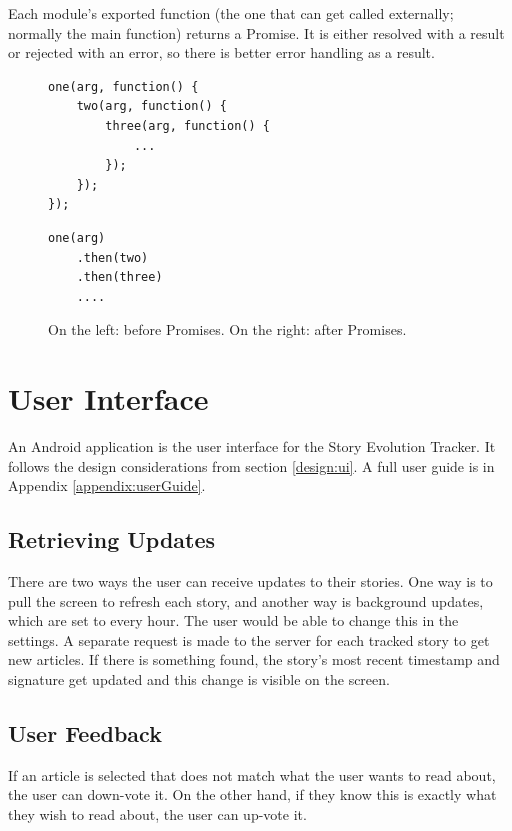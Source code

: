 \documentclass[11pt,titlepage]{report}
\begin{document}
Each module's exported function (the one that can get called externally; normally the main function) returns a Promise. It is either resolved with a result or rejected with an error, so there is better error handling as a result. 
\begin{figure}[here]
\noindent\begin{minipage}{.45\textwidth}
\begin{lstlisting}[frame=tlrb]
one(arg, function() {
    two(arg, function() {
        three(arg, function() {
	        ...
        });
    });
});
\end{lstlisting}
\end{minipage}\hfill
\begin{minipage}{.45\textwidth}
\begin{lstlisting}[frame=tlrb]
one(arg)
    .then(two)
    .then(three)
    ....
\end{lstlisting}
\end{minipage}
\caption{On the left: before Promises.  On the right: after Promises.\label{fig:promises}}
\end{figure}

\section{User Interface}
An Android application is the user interface for the Story Evolution Tracker. It follows the design considerations from section \ref{design:ui}. A full user guide is in Appendix \ref{appendix:userGuide}.

\subsection{Retrieving Updates}
There are two ways the user can receive updates to their stories. One way is to pull the screen to refresh each story, and another way is background updates, which are set to every hour. The user would be able to change this in the settings. A separate request is made to the server for each tracked story to get new articles. If there is something found, the story's most recent timestamp and signature get updated and this change is visible on the screen.

\subsection{User Feedback}
If an article is selected that does not match what the user wants to read about, the user can down-vote it. On the other hand, if they know this is exactly what they wish to read about, the user can up-vote it.
\end{document}
